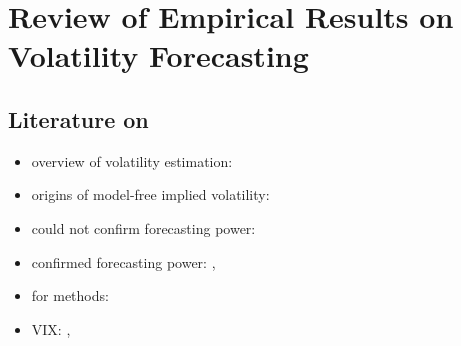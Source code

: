
\section{Review of Empirical Results on Volatility Forecasting}
\subsection{Literature on}
\begin{itemize}\itemsep0pt
\item overview of volatility estimation: \citeauthor{poon2003}
\item origins of model-free implied volatility: \citeauthor{britten2000}
\item could not confirm forecasting power: 
\item confirmed forecasting power: \citeauthor{jiang2003}, \citeauthor{bakanova2010}
\item for methods: \citeauthor{corsi2009}
\item VIX: \citeauthor{whaley2008}, \citeauthor{exchange2009}
\end{itemize}



